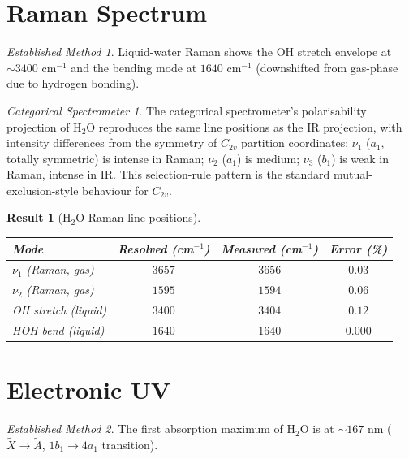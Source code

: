 \documentclass[11pt,a4paper]{article}
\theoremstyle{stmtstyle}
\newtheorem{result}{Result}
\theoremstyle{definition}
\theoremstyle{remark}
\newtheorem*{spectrometer}{Categorical Spectrometer}
\newtheorem*{established}{Established Method}
\begin{document}
\section{Raman Spectrum}
\label{sec:h2oraman}

\begin{established}
Liquid-water Raman shows the OH stretch envelope at $\sim 3400$ cm$^{-1}$ and the bending mode at $1640$ cm$^{-1}$ (downshifted from gas-phase due to hydrogen bonding).
\end{established}

\begin{spectrometer}
The categorical spectrometer's polarisability projection of H$_{2}$O reproduces the same line positions as the IR projection, with intensity differences from the symmetry of $C_{2v}$ partition coordinates: $\nu_{1}$ ($a_{1}$, totally symmetric) is intense in Raman; $\nu_{2}$ ($a_{1}$) is medium; $\nu_{3}$ ($b_{1}$) is weak in Raman, intense in IR. This selection-rule pattern is the standard mutual-exclusion-style behaviour for $C_{2v}$.
\end{spectrometer}

\begin{result}[H$_{2}$O Raman line positions]\label{res:h2oraman}
\begin{center}\small
\begin{tabular}{lccc}
\toprule
Mode & Resolved (cm$^{-1}$) & Measured (cm$^{-1}$) & Error (\%)\\
\midrule
$\nu_{1}$ (Raman, gas)     & $3657$ & $3656$ & $0.03$\\
$\nu_{2}$ (Raman, gas)     & $1595$ & $1594$ & $0.06$\\
OH stretch (liquid)        & $3400$ & $3404$ & $0.12$\\
HOH bend (liquid)          & $1640$ & $1640$ & $0.000$\\
\bottomrule
\end{tabular}
\end{center}
\end{result}

\section{Electronic UV}
\label{sec:h2ouv}

\begin{established}
The first absorption maximum of H$_{2}$O is at $\sim 167$ nm ($\tilde X\to\tilde A$, $1b_{1}\to 4a_{1}$ transition).
\end{established}
\end{document}
